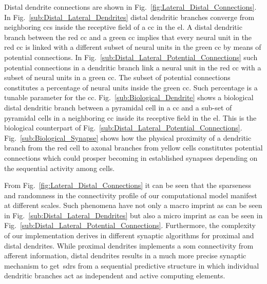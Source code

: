 {Distal dendrite connections are shown in Fig.~\ref{fig:Lateral_Distal_Connections}. In Fig.~\ref{sub:Distal_Lateral_Dendrites} distal dendritic branches converge from neighboring \glspl{cc} inside the receptive field of a \gls{cc} in the \gls{el}. A distal dendritic branch between the red \gls{cc} and a green \gls{cc} implies that every neural unit in the red \gls{cc} is linked with a different subset of neural units in the green \gls{cc} by means of potential connections. In Fig.~\ref{sub:Distal_Lateral_Potential_Connections} such potential connections in a dendritic branch link a neural unit in the red \gls{cc} with a subset of neural units in a green \gls{cc}. The subset of potential connections constitutes a percentage of neural units inside the green \gls{cc}. Such percentage is a tunable parameter for the \gls{cc}. Fig.~\ref{sub:Biological_Dendrite} shows a biological distal dendritic branch between a pyramidal cell in a \gls{cc} and a sub-set of pyramidal cells in a neighboring \gls{cc} inside its receptive field in the \gls{el}. This is the biological counterpart of Fig.~\ref{sub:Distal_Lateral_Potential_Connections}. Fig.~\ref{sub:Biological_Synapse} shows how the physical proximity of a dendritic branch from the red cell to axonal branches from yellow cells constitutes potential connections which could prosper becoming in established synapses depending on the sequential activity among cells.

From Fig.~\ref{fig:Lateral_Distal_Connections} it can be seen that the sparseness and randomness in the connectivity profile of our computational model manifest at different scales. Such phenomena have not only a macro imprint as can be seen in Fig.~\ref{sub:Distal_Lateral_Dendrites} but also a micro imprint as can be seen in Fig.~\ref{sub:Distal_Lateral_Potential_Connections}. Furthermore, the complexity of our implementation derives in different synaptic algorithms for proximal and distal dendrites. While proximal dendrites implements a \gls{som} connectivity from afferent information, distal dendrites results in a much more precise synaptic mechanism to get~\glspl{sdr} from a sequential predictive structure in which individual dendritic branches act as independent and active computing elements.
}






















